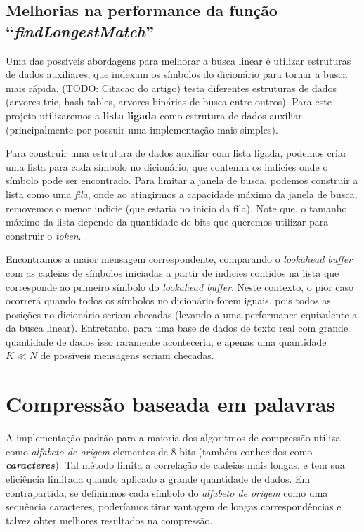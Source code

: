 \subsection{Melhorias na performance da função ``\emph{findLongestMatch}'' }

Uma das possíveis abordagens para melhorar a busca linear é utilizar estruturas de dados auxiliares, que indexam os símbolos do dicionário para tornar a busca mais rápida.
(TODO: Citacao do artigo) testa diferentes estruturas de dados (arvores trie, hash tables, arvores binárias de busca entre outros). 
Para este projeto utilizaremos a \textbf{lista ligada} como estrutura de dados auxiliar (principalmente por possuir uma implementação mais simples). 

Para construir uma estrutura de dados auxiliar com lista ligada, podemos criar uma lista para cada símbolo no dicionário, que contenha os indicies onde o símbolo pode ser encontrado.  
Para limitar a janela de busca, podemos construir a lista como uma \emph{fila}, onde ao atingirmos a capacidade máxima da janela de busca, removemos o menor indicie (que estaria no inicio da fila). 
Note que, o tamanho máximo da lista depende da quantidade de bits que queremos utilizar para construir o \emph{token}.

Encontramos a maior mensagem correspondente, comparando o \emph{lookahead buffer} com as cadeias de símbolos iniciadas a partir de indicies contidos na lista que corresponde ao primeiro símbolo do \emph{lookahead buffer}.
Neste contexto, o pior caso ocorrerá quando todos os símbolos no dicionário forem iguais, pois todos as posições no dicionário seriam checadas (levando a uma performance equivalente a da busca linear).
Entretanto, para uma base de dados de texto real com grande quantidade de dados isso raramente aconteceria, e apenas uma quantidade $K \ll N$ de possíveis mensagens seriam checadas.

\section{Compressão baseada em palavras}
A implementação padrão para a maioria dos algoritmos de compressão utiliza como \emph{alfabeto de origem} elementos de 8 bits (também conhecidos como \textbf{\emph{caracteres}}).
Tal método limita a correlação de cadeias mais longas, e tem sua eficiência limitada quando aplicado a grande quantidade de dados. 
Em contrapartida, se definirmos cada símbolo do \emph{alfabeto de origem} como uma sequência caracteres, poderíamos tirar vantagem de longas correspondências e talvez obter melhores resultados na compressão.

